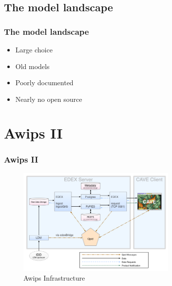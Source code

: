 \documentclass[compress]{beamer}
\begin{document}
\subsection{The model landscape}
\begin{frame}
    \frametitle{The model landscape}
    
		\begin{itemize}
		    \item Large choice
			\item Old models
			\item Poorly documented
			\item Nearly no open source
		\end{itemize}

\end{frame}

\section{Awips II}
\begin{frame}
    \frametitle{Awips II}
    \begin{center}
    	\begin{figure}
			\includegraphics[width=0.7\textwidth]{gfx/awipsII.png}
      	  	\caption[]{Awips Infrastructure \cite{Uni01}}
		\end{figure}
	\end{center}
    
\end{frame}
\end{document}
